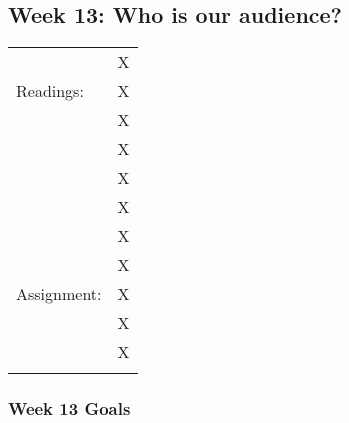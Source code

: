 \documentclass[]{article}
\begin{document}
\subsection{Week 13: Who is our
audience?}\label{week-13-who-is-our-audience}

\begin{longtable}[c]{@{}ll@{}}
\toprule\addlinespace
& X
\\\addlinespace
Readings: & X
\\\addlinespace
& X
\\\addlinespace
& X
\\\addlinespace
& X
\\\addlinespace
& X
\\\addlinespace
& X
\\\addlinespace
& X
\\\addlinespace
Assignment: & X
\\\addlinespace
& X
\\\addlinespace
& X
\\\addlinespace
\bottomrule
\end{longtable}

\subsubsection{Week 13 Goals}\label{week-13-goals}
\end{document}
